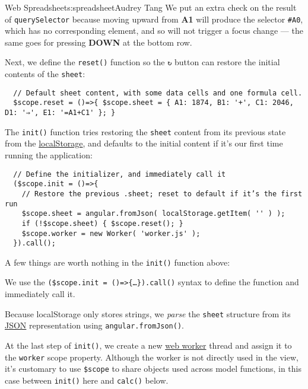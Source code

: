 \begin{aosachapter}{Web Spreadsheet}{s:spreadsheet}{Audrey Tang}
We put an extra check on the result of \texttt{querySelector} because
moving upward from \textbf{A1} will produce the selector \texttt{\#A0},
which has no corresponding element, and so will not trigger a focus
change --- the same goes for pressing \textbf{DOWN} at the bottom row.

Next, we define the \texttt{reset()} function so the \texttt{↻} button
can restore the initial contents of the \texttt{sheet}:

\begin{verbatim}
  // Default sheet content, with some data cells and one formula cell.
  $scope.reset = ()=>{ $scope.sheet = { A1: 1874, B1: '+', C1: 2046, D1: '⇒', E1: '=A1+C1' }; }
\end{verbatim}

The \texttt{init()} function tries restoring the \texttt{sheet} content
from its previous state from the
\href{https://developer.mozilla.org/en-US/docs/Web/Guide/API/DOM/Storage\#localStorage}{localStorage},
and defaults to the initial content if it's our first time running the
application:

\begin{verbatim}
  // Define the initializer, and immediately call it
  ($scope.init = ()=>{
    // Restore the previous .sheet; reset to default if it’s the first run
    $scope.sheet = angular.fromJson( localStorage.getItem( '' ) );
    if (!$scope.sheet) { $scope.reset(); }
    $scope.worker = new Worker( 'worker.js' );
  }).call();
\end{verbatim}

A few things are worth nothing in the \texttt{init()} function above:

\begin{aosaitemize}

\item
  We use the
  \texttt{(\$scope.init = ()=\textgreater{}\{\ldots{}\}).call()} syntax
  to define the function and immediately call it.
\item
  Because localStorage only stores strings, we \emph{parse} the
  \texttt{sheet} structure from its
  \href{https://developer.mozilla.org/en-US/docs/Glossary/JSON}{JSON}
  representation using \texttt{angular.fromJson()}.
\item
  At the last step of \texttt{init()}, we create a new
  \href{https://developer.mozilla.org/en-US/docs/Web/API/Worker}{web
  worker} thread and assign it to the \texttt{worker} scope property.
  Although the worker is not directly used in the view, it's customary
  to use \texttt{\$scope} to share objects used across model functions,
  in this case between \texttt{init()} here and \texttt{calc()} below.
\end{aosaitemize}


\end{aosachapter}
